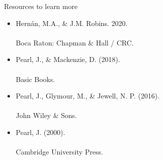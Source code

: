 \documentclass{beamer}
\newcommand\bref[2]{\href{#1}{\color{blue}{#2}}}
\begin{document}
\begin{frame}{Resources to learn more}

\begin{itemize}
\item Hernán, M.A., \& J.M. Robins. 2020.\\\bref{https://www.hsph.harvard.edu/miguel-hernan/causal-inference-book/}{Causal Inference: What If?}\\Boca Raton: Chapman \& Hall / CRC.
\item Pearl, J., \& Mackenzie, D. (2018).\\\bref{https://www.hachettebookgroup.com/titles/judea-pearl/the-book-of-why/9781541698963/?lens=basic-books}{The Book of Why: The New Science of Cause and Effect.}\\Basic Books.
\item Pearl, J., Glymour, M., \& Jewell, N. P. (2016).\\\bref{https://www.wiley.com/en-us/Causal+Inference+in+Statistics\%3A+A+Primer-p-9781119186847}{Causal Inference in Statistics: A Primer.}\\John Wiley \& Sons.
\item Pearl, J. (2000).\\\bref{https://www.cambridge.org/core/books/abs/causality/contents/E62B1C761BC88EF7A8FE13A25FDFBBCD}{Causality.}\\Cambridge University Press.
\end{itemize}

\end{frame}
\end{document}
